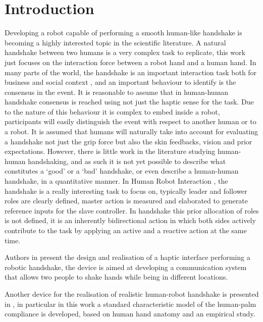 \chapter*{Introduction}
Developing a robot capable of performing a smooth human-like handshake is becoming a highly interested topic in the scientific literature.
A natural handshake between two humans is a very complex task to replicate, this work just focuses on the interaction force between a robot hand and a human hand.
In many parts of the world, the handshake is an important interaction task both for business and social context \cite{chaplin2000handshaking}, and an important behaviour to identify is the consensus in the event. It is reasonable to assume that in human-human handshake consensus is reached using not just the haptic sense for the task. Due to the nature of this behaviour it is complex to embed inside a robot, participants will easily distinguish the event with respect to another human or to a robot. It is assumed that humans will naturally take into account for evaluating a handshake not just the grip force but also the skin feedbacks, vision and prior expectations. However, there is little work in the literature studying human-human handshaking, and as such it is not yet possible to describe what constitutes a ‘good’ or a ‘bad’ handshake, or even describe a human-human handshake, in a quantitative manner.
In Human Robot Interaction \cite{sheridan2016human}, the handshake is a really interesting task to focus on, typically leader and follower roles are clearly defined, master action is measured and elaborated to generate reference inputs for the slave controller. In handshake this prior allocation of roles is not defined, it is an inherently bidirectional action in which both sides actively contribute to the task by applying an active and a reactive action at the same time.
%


Authors in \cite{pedemonte2016design}  present the design and realisation of a haptic interface performing a robotic handshake, the device is aimed at developing a communication system that allows two people to shake hands while being in different locations. 

Another device for the realisation of realistic human-robot handshake is presented in \cite{arns2017design}, in particular in this work a standard characteristic model of the human-palm compliance is developed, based on human hand anatomy and an empirical study.
	
